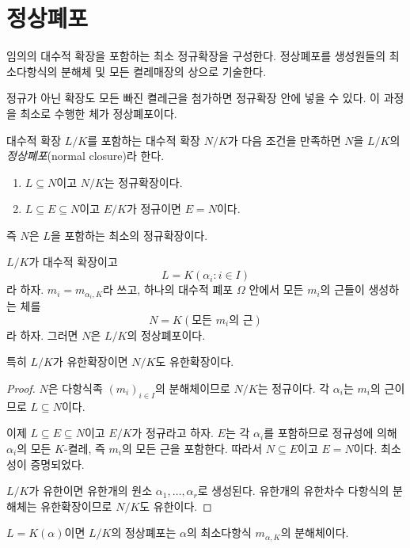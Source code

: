 \clearpage
\section{정상폐포}
\label{sec:normal-closure}

\begin{learninggoal}
임의의 대수적 확장을 포함하는 최소 정규확장을 구성한다. 정상폐포를 생성원들의 최소다항식의 분해체 및 모든 켤레매장의 상으로 기술한다.
\end{learninggoal}

정규가 아닌 확장도 모든 빠진 켤레근을 첨가하면 정규확장 안에 넣을 수 있다. 이 과정을 최소로 수행한 체가 정상폐포이다.

\begin{definition}[정상폐포]
대수적 확장 $L/K$를 포함하는 대수적 확장 $N/K$가 다음 조건을 만족하면 $N$을 $L/K$의 \emph{정상폐포}(normal closure)라 한다.
\begin{enumerate}[label=(\roman*)]
  \item $L\subseteq N$이고 $N/K$는 정규확장이다.
  \item $L\subseteq E\subseteq N$이고 $E/K$가 정규이면 $E=N$이다.
\end{enumerate}
즉 $N$은 $L$을 포함하는 최소의 정규확장이다.
\end{definition}

\begin{theorem}
$L/K$가 대수적 확장이고
\[
  L=K(\alpha_i:i\in I)
\]
라 하자. $m_i=m_{\alpha_i,K}$라 쓰고, 하나의 대수적 폐포 $\Omega$ 안에서 모든 $m_i$의 근들이 생성하는 체를
\[
  N=K(\text{모든 }m_i\text{의 근})
\]
라 하자. 그러면 $N$은 $L/K$의 정상폐포이다.

특히 $L/K$가 유한확장이면 $N/K$도 유한확장이다.
\end{theorem}

\begin{proof}
$N$은 다항식족 $(m_i)_{i\in I}$의 분해체이므로 $N/K$는 정규이다. 각 $\alpha_i$는 $m_i$의 근이므로 $L\subseteq N$이다.

이제 $L\subseteq E\subseteq N$이고 $E/K$가 정규라고 하자. $E$는 각 $\alpha_i$를 포함하므로 정규성에 의해 $\alpha_i$의 모든 $K$-켤레, 즉 $m_i$의 모든 근을 포함한다. 따라서 $N\subseteq E$이고 $E=N$이다. 최소성이 증명되었다.

$L/K$가 유한이면 유한개의 원소 $\alpha_1,\dots,\alpha_r$로 생성된다. 유한개의 유한차수 다항식의 분해체는 유한확장이므로 $N/K$도 유한이다.
\end{proof}

\begin{corollary}
$L=K(\alpha)$이면 $L/K$의 정상폐포는 $\alpha$의 최소다항식 $m_{\alpha,K}$의 분해체이다.
\end{corollary}

